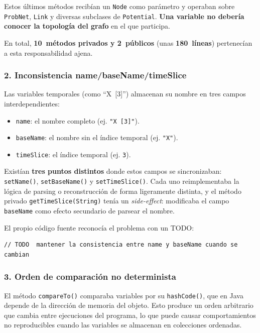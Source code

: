 \documentclass[11pt,a4paper]{article}
\newcommand{\code}[1]{\texttt{#1}}
\begin{document}
Estos \'ultimos m\'etodos recib\'ian un \code{Node} como par\'ametro y
operaban sobre \code{ProbNet}, \code{Link} y diversas subclases de
\code{Potential}.  \textbf{Una variable no deber\'ia conocer la
topolog\'ia del grafo} en el que participa.

En total, \textbf{10~m\'etodos privados y 2~p\'ublicos} (unas
\textbf{180~l\'ineas}) pertenec\'ian a esta responsabilidad ajena.

\subsubsection{2. Inconsistencia name/baseName/timeSlice}
\label{sec:prob-name}

Las variables temporales (como ``X~[3]'') almacenan su nombre en tres
campos interdependientes:

\begin{itemize}
  \item \code{name}: el nombre completo (ej. \code{"X [3]"}).
  \item \code{baseName}: el nombre sin el \'indice temporal (ej. \code{"X"}).
  \item \code{timeSlice}: el \'indice temporal (ej. \code{3}).
\end{itemize}

Exist\'ian \textbf{tres puntos distintos} donde estos campos se
sincronizaban: \code{setName()}, \code{setBaseName()} y
\code{setTimeSlice()}.  Cada uno reimplementaba la l\'ogica de parsing o
reconstrucci\'on de forma ligeramente distinta, y el m\'etodo privado
\code{getTimeSlice(String)} ten\'ia un \emph{side-effect}: modificaba el
campo \code{baseName} como efecto secundario de parsear el nombre.

El propio c\'odigo fuente reconoc\'ia el problema con un TODO:

\begin{lstlisting}
// TODO  mantener la consistencia entre name y baseName cuando se cambian
\end{lstlisting}

\subsubsection{3. Orden de comparaci\'on no determinista}

El m\'etodo \code{compareTo()} comparaba variables por su
\code{hashCode()}, que en Java depende de la direcci\'on de memoria del
objeto.  Esto produce un orden arbitrario que cambia entre ejecuciones
del programa, lo que puede causar comportamientos no reproducibles cuando
las variables se almacenan en colecciones ordenadas.
\end{document}
